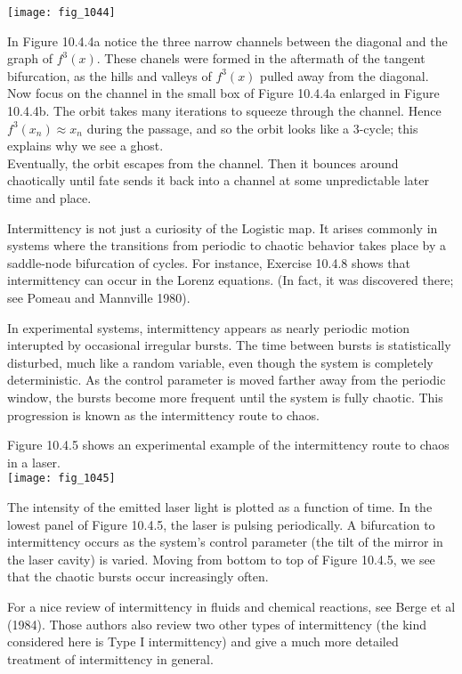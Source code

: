 \documentclass{article}
\newcommand\tab[1][1cm]{\hspace*{#1}}
\begin{document}
\texttt{[image: fig\_1044]}

In Figure 10.4.4a notice the three narrow channels between the diagonal and the graph of $f^{3}(x)$. These chanels were formed in the aftermath of the tangent bifurcation, as the hills and valleys of $f^{3}(x)$ pulled away from the diagonal. Now focus on the channel in the small box of Figure 10.4.4a enlarged in Figure 10.4.4b. The orbit takes many iterations to squeeze through the channel. Hence $f^{3}(x_{n}) \approx x_{n}$ during the passage, and so the orbit looks like a 3-cycle; this explains why we see a ghost. \\ \tab
Eventually, the orbit escapes from the channel. Then it bounces around chaotically until fate sends it back into a channel at some unpredictable later time and place. \\ \tab

Intermittency is not just a curiosity of the Logistic map. It arises commonly in systems where the transitions from periodic to chaotic behavior takes place by a saddle-node bifurcation of cycles. For instance, Exercise 10.4.8 shows that intermittency can occur in the Lorenz equations. (In fact, it was discovered there; see Pomeau and Mannville 1980). \\ \tab

In experimental systems, intermittency appears as nearly periodic motion interupted by occasional irregular bursts. The time between bursts is statistically disturbed, much like a random variable, even though the system is completely deterministic. As the control parameter is moved farther away from the periodic window, the bursts become more frequent until the system is fully chaotic. This progression is known as the intermittency route to chaos. 
\\ \tab

Figure 10.4.5 shows an experimental example of the intermittency route to chaos in a laser. \\

\texttt{[image: fig\_1045]}

The intensity of the emitted laser light is plotted as a function of time. In the lowest panel of Figure 10.4.5, the laser is pulsing periodically. A bifurcation to intermittency occurs as the system's control parameter (the tilt of the mirror in the laser cavity) is varied. Moving from bottom to top of Figure 10.4.5, we see that the chaotic bursts occur increasingly often. \\ \tab

For a nice review of intermittency in fluids and chemical reactions, see Berge et al (1984). Those authors also review two other types of intermittency (the kind considered here is Type I intermittency) and give a much more detailed treatment of intermittency in general. 
\end{document}
